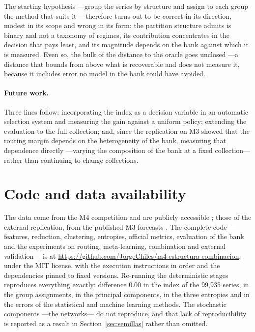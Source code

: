 The starting hypothesis ---group the series by structure and assign to each group the
method that suits it--- therefore turns out to be correct in its direction, modest in its
scope and wrong in its form: the partition structure admits is binary and not a taxonomy
of regimes, its contribution concentrates in the decision that pays least, and its
magnitude depends on the bank against which it is measured. Even so, the bulk of the
distance to the oracle goes unclosed ---a distance that bounds from above what is
recoverable and does not measure it, because it includes error no model in the bank could
have avoided.

\paragraph{Future work.} Three lines follow: incorporating the index as a decision
variable in an automatic selection system and measuring the gain against a uniform policy;
extending the evaluation to the full collection; and, since the replication on M3 showed
that the routing margin depends on the heterogeneity of the bank, measuring that
dependence directly ---varying the composition of the bank at a fixed collection--- rather
than continuing to change collections.


\section*{Code and data availability}

The data come from the M4 competition and are publicly accessible \cite{m4results}; those
of the external replication, from the published M3 forecasts \cite{mcomp}. The complete
code ---features, reduction, clustering, entropies, official metrics, evaluation of the
bank and the experiments on routing, meta-learning, combination and external
validation--- is at \url{https://github.com/JorgeChiles/m4-estructura-combinacion}, under
the MIT license, with the execution instructions in order and the dependencies pinned to
fixed versions. Re-running the deterministic stages reproduces everything exactly:
difference $0.00$ in the index of the 99{,}935 series, in the group assignments, in the
principal components, in the three entropies and in the errors of the statistical and
machine learning methods. The stochastic components ---the networks--- do not reproduce,
and that lack of reproducibility is reported as a result in
Section~\ref{sec:semillas} rather than omitted.


